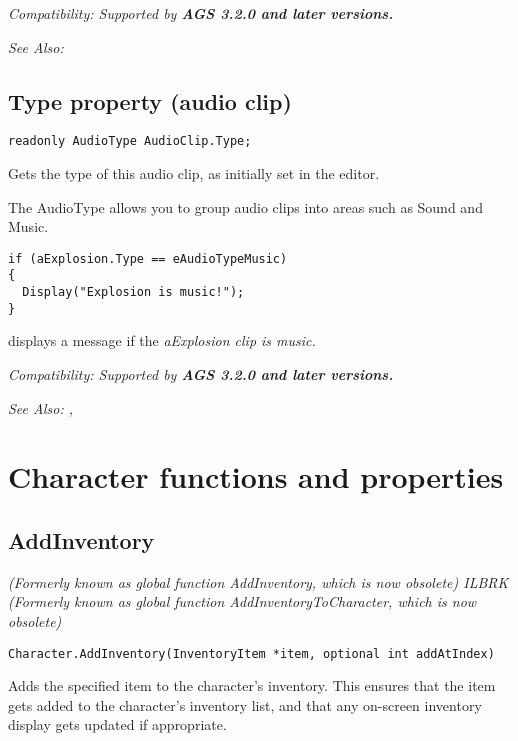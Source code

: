 \it{Compatibility:} Supported by \bf{AGS 3.2.0} and later versions.

\it{See Also:} 


\subsection{Type property (audio clip)}\label{AudioClip.Type}%

\begin{verbatim}
readonly AudioType AudioClip.Type;
\end{verbatim}
Gets the type of this audio clip, as initially set in the editor.

The AudioType allows you to group audio clips into areas such as Sound and Music.

\begin{verbatim}
if (aExplosion.Type == eAudioTypeMusic)
{
  Display("Explosion is music!");
}
\end{verbatim}
displays a message if the \it{aExplosion} clip is music.

\it{Compatibility:} Supported by \bf{AGS 3.2.0} and later versions.

\it{See Also:} ,


\section{Character functions and properties}%


\subsection{AddInventory}\label{Character.AddInventory}%

\it{(Formerly known as global function AddInventory, which is now obsolete)} ILBRK
\it{(Formerly known as global function AddInventoryToCharacter, which is now obsolete)}

\begin{verbatim}
Character.AddInventory(InventoryItem *item, optional int addAtIndex)
\end{verbatim}
Adds the specified item to the character's inventory. This
ensures that the item gets added to the character's inventory list, and that
any on-screen inventory display gets updated if appropriate.

